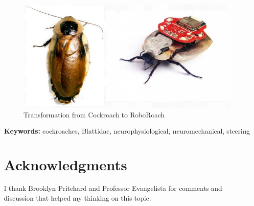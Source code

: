 \documentclass{article}
\begin{document}
\begin{figure}[ht!]
\centering
\includegraphics[scale=0.5]{Figures/motivation2.JPG}
\caption{Transformation from Cockroach to RoboRoach}
\label{fig:motivation2}
\end{figure}

{\scriptsize\textbf{Keywords:} cockroaches, Blattidae, neurophysiological, neuromechanical, steering}



\section{Acknowledgments}
I thank Brooklyn Pritchard and Professor Evangelista for comments and discussion that helped my thinking on this topic.



\appendix 
\end{document}
